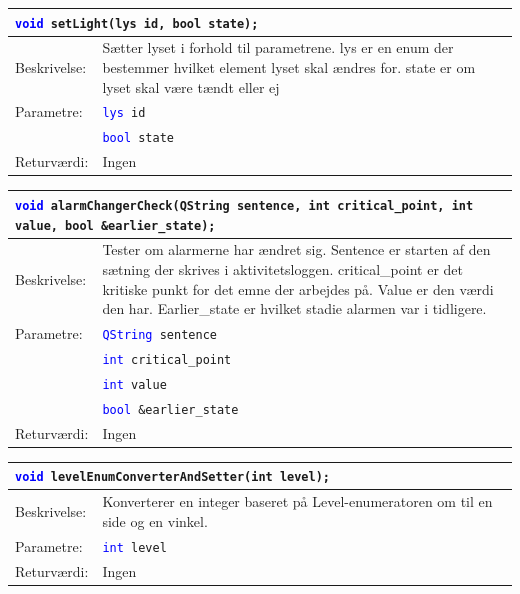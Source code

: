 \begin{table}[H]
\begin{tabular}{l p{12.5cm}}
\multicolumn{2}{l}{\texttt{\textcolor{blue}{void} setLight(lys id, bool state);}} \\
\hline
Beskrivelse:&Sætter lyset i forhold til parametrene. lys er en enum der bestemmer hvilket element lyset skal ændres for. state er om lyset skal være tændt eller ej\\
Parametre:&\texttt{\textcolor{blue}{lys} id}\\
&\texttt{\textcolor{blue}{bool} state}\\
Returværdi:&Ingen\\
\end{tabular}
\end{table}


\begin{table}[H]
\begin{tabular}{l p{12.5cm}}
\multicolumn{2}{l}{\texttt{\textcolor{blue}{void} alarmChangerCheck(QString sentence, int critical\_point, int value, bool \&earlier\_state);}} \\
\hline
Beskrivelse: &Tester om alarmerne har ændret sig. Sentence er starten af den sætning der skrives i aktivitetsloggen. critical\_point er det kritiske punkt for det emne der arbejdes på. Value er den værdi den har. Earlier\_state er hvilket stadie alarmen var i tidligere.\\
Parametre:&\texttt{\textcolor{blue}{QString} sentence}\\
&\texttt{\textcolor{blue}{int} critical\_point}\\
&\texttt{\textcolor{blue}{int} value}\\
&\texttt{\textcolor{blue}{bool} \&earlier\_state}\\
Returværdi:&Ingen\\
\end{tabular}
\end{table}

\begin{table}[H]
\begin{tabular}{l p{12.5cm}}
\multicolumn{2}{l}{\texttt{\textcolor{blue}{void} levelEnumConverterAndSetter(int level);}} \\
\hline
Beskrivelse: &Konverterer en integer baseret på Level-enumeratoren om til en side og en vinkel.\\
Parametre:&\texttt{\textcolor{blue}{int} level}\\
Returværdi:&Ingen\\
\end{tabular}
\end{table}


